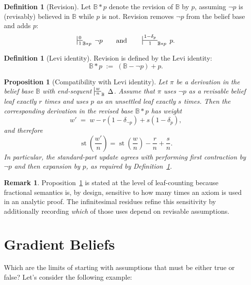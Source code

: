 \documentclass[12pt,a4paper,reqno]{amsart}
\newtheorem{proposition}[theorem]{Proposition}
\theoremstyle{definition}
\newtheorem{definition}[theorem]{Definition}
\newtheorem{remark}[theorem]{Remark}
\newcommand{\numberset}{\mathbb}
\newcommand{\B}{\numberset{B}}
\DeclareMathOperator{\st}{st}
\begin{document}
\begin{definition}[Revision]\label{def:revision}
Let $\B * p$ denote the revision of $\B$ by $p$, assuming $\neg p$ is (revisably) believed in $\B$ while $p$ is not.  Revision removes $\neg p$ from the belief base and adds $p$:
\[
\sststile{1}{0}_{\B*p}\, \neg p
\qquad\text{and}\qquad
\sststile{1}{1-\delta_p}_{\B*p}\, p.
\]
\end{definition}

\begin{definition}[Levi identity]\label{def:levi}
Revision is defined by the Levi identity:
\[
\B * p \;:=\; (\B-\neg p)+p .
\]
\end{definition}

\begin{proposition}[Compatibility with Levi identity]\label{prop:levi-fs}
Let $\pi$ be a derivation in the belief base $\B$ with end-sequent $\sststile{n}{w}_\B\, \Delta$.
Assume that $\pi$ uses $\neg p$ as a revisable belief leaf exactly $r$ times and uses $p$ as an unsettled leaf exactly $s$ times.
Then the corresponding derivation in the revised base $\B*p$ has weight
\[
w' \;=\; w - r(1-\delta_{\neg p}) + s(1-\delta_p),
\]
and therefore
\[
\st\!\left(\frac{w'}{n}\right)=\st\!\left(\frac{w}{n}\right) - \frac{r}{n} + \frac{s}{n}.
\]
In particular, the standard-part update agrees with performing first contraction by $\neg p$ and then expansion by $p$, as required by Definition~\ref{def:levi}.
\end{proposition}

\begin{remark}
Proposition~\ref{prop:levi-fs} is stated at the level of leaf-counting because fractional semantics is, by design, sensitive to how many times an axiom is used in an analytic proof.  The infinitesimal residues refine this sensitivity by additionally recording \emph{which} of those uses depend on revisable assumptions.
\end{remark}
\section{Gradient Beliefs}
\label{sec:gradient}

Which are the limits of starting with assumptions that must be either true or false? Let's consider the following example:
\end{document}
